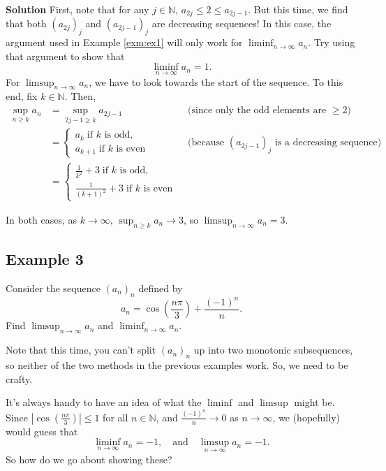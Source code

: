 \documentclass[
  10pt,
  a4paper]{article}
\theoremstyle{plain}
\theoremstyle{definition}
\theoremstyle{plain}
\theoremstyle{plain}
\theoremstyle{plain}
\theoremstyle{plain}
\theoremstyle{definition}
\theoremstyle{definition}
\theoremstyle{remark}
\theoremstyle{remark}
\let\BeginKnitrBlock\begin \let\EndKnitrBlock\end
\begin{document}
\textbf{Solution}
First, note that for any \(j\in\mathbb{N}\), \(a_{2j} \leq 2 \leq a_{2j-1}\). But this time, we find that both \((a_{2j})_j\) and \((a_{2j-1})_j\) are decreasing sequences! In this case, the argument used in Example \ref{exm:ex1} will only work for \(\liminf_{n\to\infty} a_n.\) Try using that argument to show that \[\liminf_{n\to\infty}a_n = 1.\] For \(\limsup_{n\to\infty} a_n\), we have to look towards the start of the sequence. To this end, fix \(k \in \mathbb{N}\). Then,
\begin{align*}
\sup_{n\geq k}a_n &= \sup_{2j-1 \geq k} a_{2j - 1} \; \; &&\text{(since only the odd elements are $\geq 2$)}\\
&=\begin{cases}
a_k \; \text{if $k$ is odd},\\
a_{k+1} \; \text{if $k$ is even}\end{cases} \; \; &&\text{(because $(a_{2j-1})_j$ is a decreasing sequence)}\\
&=\begin{cases}
\frac{1}{k^2} + 3 \; \text{if $k$ is odd},\\
\frac{1}{(k+1)^2} + 3 \; \text{if $k$ is even}\end{cases}
\end{align*}

In both cases, as \(k \to \infty\), \(\sup_{n\geq k }a_n \to 3\), so \(\limsup_{n \to \infty} a_n = 3\).

\hypertarget{example-3}{%
\subsection*{Example 3}\label{example-3}}

\BeginKnitrBlock{example}
{\label{exm:ex3} }Consider the sequence \((a_n)_{n}\) defined by \[a_n = \cos\left(\frac{n\pi}{3}\right) + \frac{(-1)^n}{n}.\] Find \(\limsup_{n \to \infty} a_n\) and \(\liminf_{n \to \infty} a_n\).
\EndKnitrBlock{example}
Note that this time, you can't split \((a_n)_n\) up into two monotonic subsequences, so neither of the two methods in the previous examples work. So, we need to be crafty.

It's always handy to have an idea of what the \(\liminf\) and \(\limsup\) might be. Since \(\left\lvert\cos\left(\frac{n\pi}{3}\right)\right\rvert \leq 1\) for all \(n \in \mathbb{N}\), and \(\frac{(-1)^n}{n} \to 0\) as \(n \to \infty\), we (hopefully) would guess that \[\liminf_{n\to\infty}a_n = -1, \quad \text{and} \quad \limsup_{n \to \infty} a_n = -1.\] So how do we go about showing these?
\end{document}
